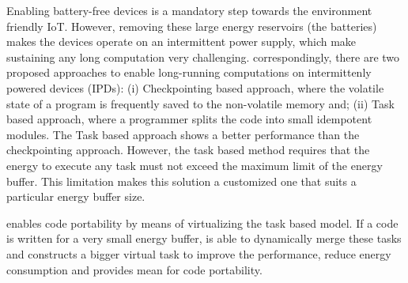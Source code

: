 

Enabling battery-free devices is a mandatory step towards the environment friendly IoT. However, removing these large energy reservoirs (the batteries) makes the devices operate on an intermittent power supply, which make sustaining any long computation very challenging. correspondingly, there are two proposed approaches to enable long-running computations on intermittenly powered devices (IPDs): (i) Checkpointing based approach, where the volatile state of a program is frequently saved to the non-volatile memory and; (ii)  Task based approach, where a programmer splits the code into small idempotent modules. The Task based approach shows a better performance than the checkpointing approach. However, the task based method requires that the energy to execute any task must not exceed the maximum limit of the energy buffer. This limitation makes this solution a customized one that suits a particular energy buffer size. 

\sys enables code portability by means of virtualizing the task based model. If a code is written for a very small energy buffer, \sys is able to dynamically merge these tasks and constructs a bigger virtual task to improve the performance, reduce energy consumption and provides mean for code portability. 
